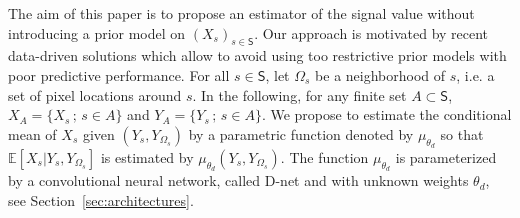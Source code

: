 \documentclass[lettersize,journal]{IEEEtran}
\begin{document}


The aim of this paper is to propose an estimator of the signal value without introducing a prior model on $(X_s)_{s\in \mathsf{S}}$. Our approach is motivated by recent data-driven solutions which allow to avoid using too restrictive prior models with poor predictive performance. For all $s\in \mathsf{S}$, let $\Omega_s$ be a neighborhood of $s$, i.e. a set of pixel locations around $s$. In the following, for any finite set $A \subset \mathsf{S}$, $X_A = \{X_s\,;\, s\in A\}$ and $Y_A = \{Y_s\,;\, s\in A\}$. We propose to estimate the conditional mean of $X_s$ given $(Y_s,Y_{\Omega_s})$ by a parametric function denoted by $\mu_{\theta_d}$ so that $\mathbb{E}[X_s|Y_s,Y_{\Omega_s}]$ is estimated by $\mu_{\theta_d}(Y_s,Y_{\Omega_s})$. The function $ \mu_{\theta_d}$ is parameterized by a convolutional neural network, called D-net and with unknown weights $\theta_d$, see Section~\ref{sec:architectures}.
\end{document}
